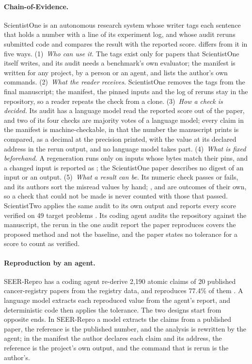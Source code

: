 \paragraph{Chain-of-Evidence.} ScientistOne \citep{meng2026scientistone} is an autonomous
research system whose writer tags each sentence that holds a number with a line of its
experiment log, and whose audit reruns submitted code and compares the result with the reported
score.  differs from it in five ways. (1)~\emph{Who can use it.} The
tags exist only for papers that ScientistOne itself writes, and its audit needs a benchmark's
own evaluator; the  manifest is written for any project, by a person or an agent, and
lists the author's own commands. (2)~\emph{What the reader receives.} ScientistOne removes the tags from
the final manuscript; the manifest, the pinned inputs and the log of reruns stay in the
repository, so a reader repeats the check from a clone. (3)~\emph{How a check is decided.} Its
audit has a language model read the reported score out of the paper, and two of its four checks
are majority votes of a language model; every claim in the manifest is machine-checkable, in
that the number the manuscript prints is compared, as a decimal at the precision printed, with
the value at its declared address in the rerun output, and no language model takes part. (4)~\emph{What is fixed beforehand.} A regeneration
runs only on inputs whose bytes match their pins, and a changed input is reported as
; the ScientistOne paper describes no digest of an input or an output. (5)~\emph{What a result can be.}
Its numeric check passes or fails, and its authors sort the misread values by hand;
,  and  are outcomes of their own, so a check that
could not be made is never counted with those that passed. ScientistTwo applies the same audit
to its own output and reports every score verified on 49 target problems
\citep{nam2026scientisttwo}. Its coding agent audits the repository against the manuscript, the
rerun in the one audit report the paper reproduces covers the proposed method and not the
baseline, and the paper states no tolerance for a score to count as verified.

\paragraph{Reproduction by an agent.} SEER-Repro has a coding agent re-derive 2{,}190 atomic claims
of 20 published cancer-registry papers from the registry data, and reproduces 77.4\% of them
\citep{liu2026seerrepro}. A language model extracts each reproduced value from the agent's
report, and deterministic code then applies the tolerance. The two designs start from opposite
ends. In SEER-Repro a model extracts the claims from a published paper, the reference is the
published number, and the analysis is rewritten by the agent; in the  manifest the
author declares each claim and its address, the reference is the project's own output, and the
command that is rerun is the author's.

